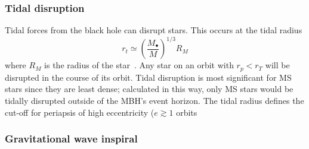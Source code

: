 \documentclass[useAMS,usedcolumn,usegraphicx,usenatbib]{mn2e}
\begin{document}
\subsubsection{Tidal disruption}

Tidal forces from the black hole can disrupt stars. This occurs at the tidal radius
\begin{equation}
r_t \simeq \left(\frac{M_\bullet}{M}\right)^{1/3}R_M
\end{equation}
where $R_M$ is the radius of the star~\citep{Kobayashi2004}. Any star on an orbit with $r_p < r_T$ will be disrupted in the course of its orbit. Tidal disruption is most significant for MS stars since they are least dense; calculated in this way, only MS stars would be tidally disrupted outside of the MBH's event horizon. The tidal radius defines the cut-off for periapsis of high eccentricity ($e \gtrsim 1$ orbits~\citep{Lightman1977}

\subsubsection{Gravitational wave inspiral}
\end{document}
